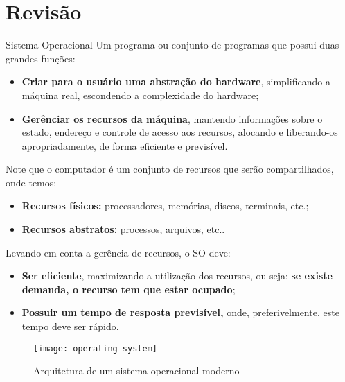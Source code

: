 \chapter{Revisão}

\begin{definicao}{Sistema Operacional}
  Um programa ou conjunto de programas que possui duas grandes funções:
  \begin{itemize}
    \item \textbf{Criar para o usuário uma abstração do hardware}, simplificando a máquina real, escondendo a complexidade do hardware;

    \item \textbf{Gerênciar os recursos da máquina}, mantendo informações sobre o estado, endereço e controle de acesso aos recursos, alocando e liberando-os apropriadamente, de forma eficiente e previsível.
  \end{itemize}
\end{definicao}

Note que o computador é um conjunto de recursos que serão compartilhados, onde temos:
\begin{itemize}
  \item \textbf{Recursos físicos:} processadores, memórias, discos, terminais, etc.;

  \item \textbf{Recursos abstratos:} processos, arquivos, etc..
\end{itemize}

Levando em conta a gerência de recursos, o SO deve:
\begin{itemize}
  \item \textbf{Ser eficiente}, maximizando a utilização dos recursos, ou seja: \textbf{se existe demanda, o recurso tem que estar ocupado};

  \item \textbf{Possuir um tempo de resposta previsível,} onde, preferivelmente, este tempo deve ser rápido.
\end{itemize}

\begin{figure}[h]
  \centering
  \texttt{[image: operating-system]}
  \caption{Arquitetura de um sistema operacional moderno}
  \label{fig:operating-system}
\end{figure}














